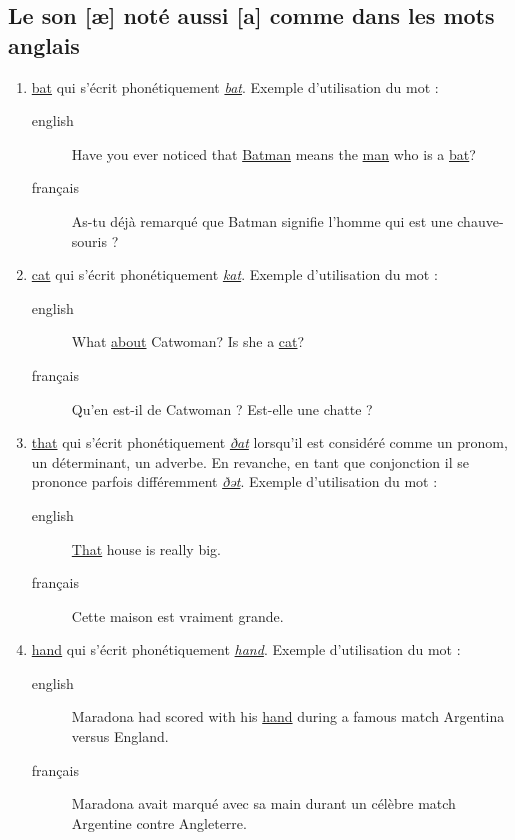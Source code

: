 \documentclass[12pt,a4paper]{book}
\begin{document}
\subsection{Le son [æ] noté aussi [a] comme dans les mots anglais}
\label{sec:orgb23ea7e}
\begin{enumerate}
\item \href{http://www.wordreference.com/enfr/bat}{bat} qui s'écrit phonétiquement \href{https://en.oxforddictionaries.com/definition/bat}{\emph{bat}}. Exemple d'utilisation du mot :
\begin{description}
\item[{english}] \textenglish{Have you ever noticed that \href{https://www.youtube.com/watch?v=O24Ui015YXM}{Batman} means the \href{https://youtu.be/24howVwYgHY}{man} who
is a \href{https://youtu.be/eozL5n2Plmc}{bat}?}
\item[{français}] As-tu déjà remarqué que Batman signifie l'homme qui
est une chauve-souris ?
\end{description}
\item \href{http://www.wordreference.com/enfr/cat}{cat} qui s'écrit phonétiquement \href{https://en.oxforddictionaries.com/definition/cat}{\emph{kat}}. Exemple d'utilisation du mot :
\begin{description}
\item[{english}] \textenglish{What \href{https://youtu.be/7FjChUY0zgQ}{about} Catwoman? Is she a \href{https://youtu.be/eNQazP-wdj4}{cat}?}
\item[{français}] Qu'en est-il de Catwoman ? Est-elle une chatte ?
\end{description}
\item \href{http://www.wordreference.com/enfr/that}{that} qui s'écrit phonétiquement \href{https://en.oxforddictionaries.com/definition/that}{\emph{ðat}} lorsqu'il est considéré comme
un pronom, un déterminant, un adverbe. En revanche, en tant que
conjonction il se prononce parfois différemment \href{https://en.oxforddictionaries.com/definition/that}{\emph{ðət}}. Exemple d'utilisation du mot :
\begin{description}
\item[{english}] \textenglish{\href{https://youtu.be/HAlz5TiKOCM}{That} house is really big.}
\item[{français}] Cette maison est vraiment grande.
\end{description}
\item \href{http://www.wordreference.com/enfr/hand}{hand} qui s'écrit phonétiquement \href{https://en.oxforddictionaries.com/definition/hand}{\emph{hand}}. Exemple d'utilisation du mot : 
\begin{description}
\item[{english}] \textenglish{Maradona had scored with his \href{https://youtu.be/KDKBY9FqwQg}{hand} during a famous
match Argentina versus England.}
\item[{français}] Maradona avait marqué avec sa main durant un célèbre
match Argentine contre Angleterre.
\end{description}
\end{enumerate}
\end{document}

